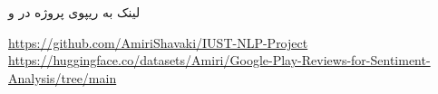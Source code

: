 \Section
{لینک به ریپوی پروژه در 
و }
{
\begin{center}
\url{https://github.com/AmiriShavaki/IUST-NLP-Project}
\url{https://huggingface.co/datasets/Amiri/Google-Play-Reviews-for-Sentiment-Analysis/tree/main}
\end{center}
}